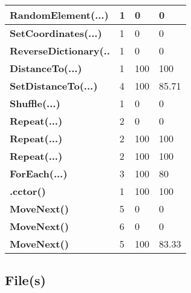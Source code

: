 \documentclass[a4paper,10pt]{article}
\begin{document}
\begin{longtable}[l]{|l|l|l|l|}
\hline
\textbf{RandomElement(...)} & 1 & 0 & 0\\
\hline
\textbf{SetCoordinates(...)} & 1 & 0 & 0\\
\hline
\textbf{ReverseDictionary(..} & 1 & 0 & 0\\
\hline
\textbf{DistanceTo(...)} & 1 & 100 & 100\\
\hline
\textbf{SetDistanceTo(...)} & 4 & 100 & 85.71\\
\hline
\textbf{Shuffle(...)} & 1 & 0 & 0\\
\hline
\textbf{Repeat(...)} & 2 & 0 & 0\\
\hline
\textbf{Repeat(...)} & 2 & 100 & 100\\
\hline
\textbf{Repeat(...)} & 2 & 100 & 100\\
\hline
\textbf{ForEach(...)} & 3 & 100 & 80\\
\hline
\textbf{.cctor()} & 1 & 100 & 100\\
\hline
\textbf{MoveNext()} & 5 & 0 & 0\\
\hline
\textbf{MoveNext()} & 6 & 0 & 0\\
\hline
\textbf{MoveNext()} & 5 & 100 & 83.33\\
\hline
\end{longtable}
\subsection{File(s)}
\end{document}
